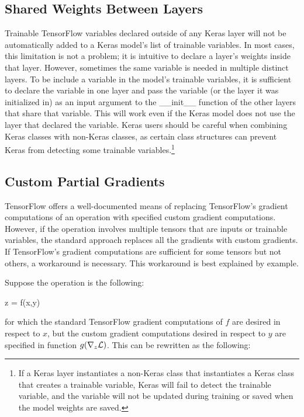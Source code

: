 \subsection{Shared Weights Between Layers}
Trainable TensorFlow variables declared outside of any Keras layer will not be automatically added to a Keras model's list of trainable variables. In most cases, this limitation is not a problem; it is intuitive to declare a layer's weights inside that layer. However, sometimes the same variable is needed in multiple distinct layers. To be include a variable in the model's trainable variables, it is sufficient to declare the variable in one layer and pass the variable (or the layer it was initialized in) as an input argument to the \_\_init\_\_ function of the other layers that share that variable. This will work even if the Keras model does not use the layer that declared the variable. Keras users should be careful when combining Keras classes with non-Keras classes, as certain class structures can prevent Keras from detecting some trainable variables.\footnote{If a Keras layer instantiates a non-Keras class that instantiates a Keras class that creates a trainable variable, Keras will fail to detect the trainable variable, and the variable will not be updated during training or saved when the model weights are saved.}

\subsection{Custom Partial Gradients}
TensorFlow offers a well-documented means of replacing TensorFlow's gradient computations of an operation with specified custom gradient computations. However, if the operation involves multiple tensors that are inputs or trainable variables, the standard approach replaces all the gradients with custom gradients. If TensorFlow's gradient computations are sufficient for some tensors but not others, a workaround is necessary. This workaround is best explained by example.

Suppose the operation is the following:


\begin{code}
z = f(x,y)
\end{code}

for which the standard TensorFlow gradient computations of $f$ are desired in respect to $x$, but the custom gradient computations desired in respect to $y$ are specified in function $g(\nabla_z \mathcal{L})$. This can be rewritten as the following:

